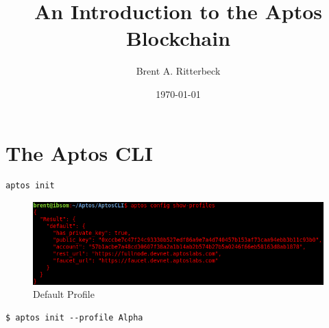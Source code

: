 \documentclass[12pt]{book}
\title{An Introduction to the Aptos Blockchain}
\author{Brent A. Ritterbeck}
\date{\today}
\theoremstyle{definition}
\theoremstyle{plain}
\begin{document}
\maketitle

\chapter{The Aptos CLI}

\begin{lstlisting}[caption={Creating a Default Profile}]
aptos init
\end{lstlisting}

\begin{figure}[htp]
\centering
\includegraphics[scale=0.50]{./images/default_profile.png}
\caption{Default Profile}
\end{figure}

\begin{lstlisting}[caption={Creating a Named Profile}]
$ aptos init --profile Alpha
\end{lstlisting}
\end{document}
